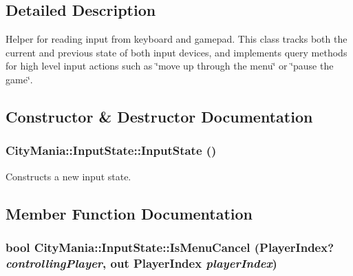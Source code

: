 \subsection{Detailed Description}
Helper for reading input from keyboard and gamepad. This class tracks both the current and previous state of both input devices, and implements query methods for high level input actions such as \char`\"{}move up through the menu\char`\"{} or \char`\"{}pause the game\char`\"{}. 

\subsection{Constructor \& Destructor Documentation}
\hypertarget{classCityMania_1_1InputState_ad3e00d88b010b3907b2bfce4f0da2343}{
\subsubsection[{InputState}]{\setlength{\rightskip}{0pt plus 5cm}CityMania::InputState::InputState ()}}
\label{classCityMania_1_1InputState_ad3e00d88b010b3907b2bfce4f0da2343}


Constructs a new input state. 

\subsection{Member Function Documentation}
\hypertarget{classCityMania_1_1InputState_a4b2e434f6f379a0d6aa8f7ff9d915b7e}{
\subsubsection[{IsMenuCancel}]{\setlength{\rightskip}{0pt plus 5cm}bool CityMania::InputState::IsMenuCancel (PlayerIndex? {\em controllingPlayer}, \/  out PlayerIndex {\em playerIndex})}}
\label{classCityMania_1_1InputState_a4b2e434f6f379a0d6aa8f7ff9d915b7e}


